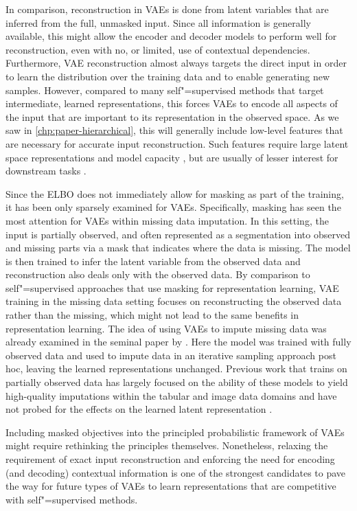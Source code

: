 In comparison, reconstruction in VAEs is done from latent variables that are inferred from the full, unmasked input. Since all information is generally available, this might allow the encoder and decoder models to perform well for reconstruction, even with no, or limited, use of contextual dependencies. Furthermore, VAE reconstruction almost always targets the direct input in order to learn the distribution over the training data and to enable generating new samples. However, compared to many self"=supervised methods that target intermediate, learned representations, this forces VAEs to encode all aspects of the input that are important to its representation in the observed space. As we saw in \cref{chp:paper-hierarchical}, this will generally include low-level features that are necessary for accurate input reconstruction. Such features require large latent space representations and model capacity \parencite{vahdat_nvae_2020,child_very_2021}, but are usually of lesser interest for downstream tasks \parencite{baevski_wav2vec_2020}.

Since the ELBO does not immediately allow for masking as part of the training, it has been only sparsely examined for VAEs. Specifically, masking has seen the most attention for VAEs within missing data imputation. In this setting, the input is partially observed, and often represented as a segmentation into observed and missing parts via a mask that indicates where the data is missing. The model is then trained to infer the latent variable from the observed data and reconstruction also deals only with the observed data. 
By comparison to self"=supervised approaches that use masking for representation learning, VAE training in the missing data setting focuses on reconstructing the observed data rather than the missing, which might not lead to the same benefits in representation learning. 
The idea of using VAEs to impute missing data was already examined in the seminal paper by \textcite{rezende_stochastic_2014}. Here the model was trained with fully observed data and used to impute data in an iterative sampling approach post hoc, leaving the learned representations unchanged.
Previous work that trains on partially observed data has largely focused on the ability of these models to yield high-quality imputations within the tabular and image data domains and have not probed for the effects on the learned latent representation \parencite{mattei_miwae_2019, ipsen_not-miwae_2021}. 

Including masked objectives into the principled probabilistic framework of VAEs might require rethinking the principles themselves. Nonetheless, relaxing the requirement of exact input reconstruction and enforcing the need for encoding (and decoding) contextual information is one of the strongest candidates to pave the way for future types of VAEs to learn representations that are competitive with self"=supervised methods.


